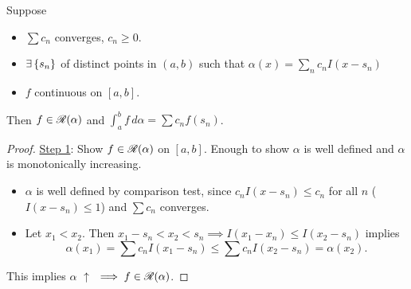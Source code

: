 \documentclass[]{article}
\begin{document}
\begin{theorem}
	Suppose
	\begin{itemize}
		\item $\sum c_n$ converges, $c_n\geq0$.
		\item $\exists\left\{ s_n \right\}$ of distinct points in $(a,b)$ such that $\alpha(x) = \sum_nc_n I(x-s_n)$
		\item $f$ continuous on $[a,b]$.
	\end{itemize}
	Then $f\in\mathscr{R}(\alpha)$ and $\int_a^bf\,d\alpha = \sum c_n f(s_n)$.
\end{theorem}
\newpage
\begin{proof}
	\ul{Step 1}: Show $f\in\mathscr{R}(\alpha)$ on $[a,b]$.
	Enough to show $\alpha$ is well defined and $\alpha$ is monotonically increasing.
	\begin{itemize}
		\item $\alpha$ is well defined by comparison test, since $c_nI(x-s_n) \leq c_n$ for all $n$ ($I(x-s_n)\leq 1$) and $\sum c_n$ converges.
		\item Let $x_1<x_2$. Then $x_1-s_n < x_2<s_n \implies I(x_1-x_n)\leq I(x_2-s_n)$ implies $$\alpha(x_1) = \sum c_nI(x_1-s_n) \leq \sum c_nI(x_2-s_n) = \alpha(x_2).$$
	\end{itemize}
	This implies $\alpha$ $\uparrow$ $\implies f\in\mathscr{R}(\alpha)$.
\end{proof}
\end{document}
